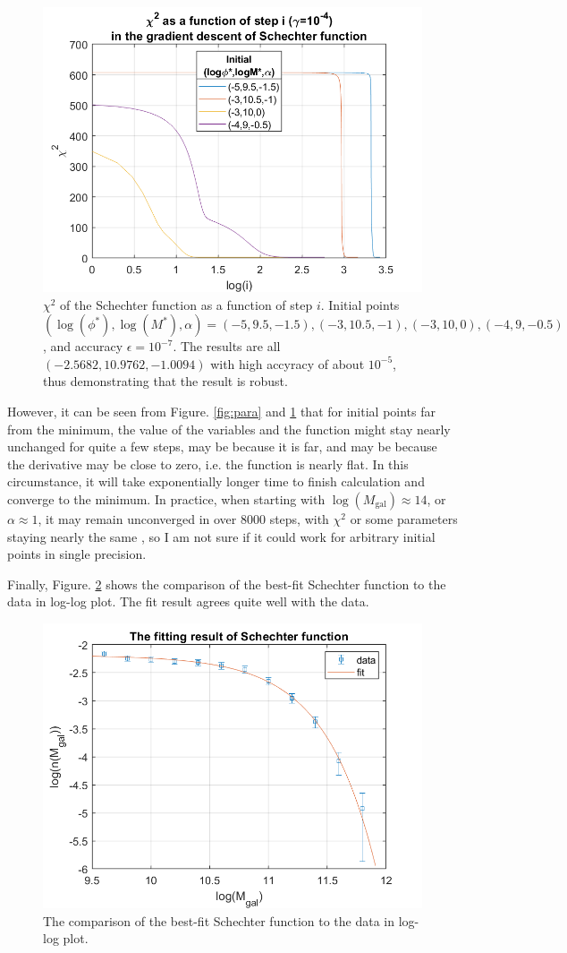 \documentclass[12pt, graphicx]{article}
\begin{document}
\begin{figure}[ht]
\centering
\includegraphics[width = 120mm]{chi2.png}
\caption{$\chi^2$ of the Schechter function as a function of step $i$. Initial points $(\log(\phi^*),\log(M^*),\alpha)=(-5,9.5,-1.5),(-3,10.5,-1),(-3,10,0),(-4,9,-0.5)$, and accuracy $\epsilon=10^{-7}$. The results are all $(-2.5682,10.9762,-1.0094)$ with high accyracy of about $10^{-5}$, thus demonstrating that the result is robust.}
\label{fig:chi2}
\end{figure}

However, it can be seen from Figure. \ref{fig:para} and \ref{fig:chi2} that for initial points far from the minimum, the value of the variables and the function might stay nearly unchanged for quite a few steps, may be because it is far, and may be because the derivative may be close to zero, i.e. the function is nearly flat. In this circumstance, it will take exponentially longer time to finish calculation and converge to the minimum. In practice, when starting with $\log(M_\mathrm{gal})\approx14$, or $\alpha\approx1$, it may remain unconverged in over 8000 steps, with $\chi^2$ or some parameters staying nearly the same , so I am not sure if it could work for arbitrary initial points in single precision. \par
Finally, Figure. \ref{fig:fit} shows the comparison of the best-fit Schechter function to the data in log-log plot. The fit result agrees quite well with the data. 

\begin{figure}[ht]
\centering
\includegraphics[width = 120mm]{fit.png}
\caption{The comparison of the best-fit Schechter function to the data in log-log plot.}
\label{fig:fit}
\end{figure}
\end{document}

